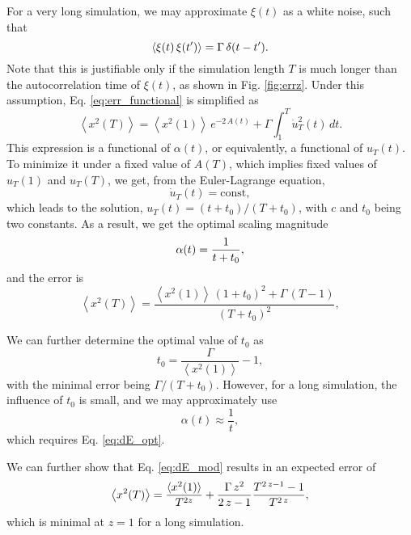 \documentclass[reprint]{revtex4-1}
\begin{document}
For a very long simulation,
we may approximate $\xi(t)$ as a white noise,
such that
\begin{equation}
  \left\langle \xi(t) \, \xi(t') \right\rangle
  = \Gamma \, \delta(t - t').
  \notag
\end{equation}
%
Note that this is justifiable only
if the simulation length $T$ is much longer than
the autocorrelation time of $\xi(t)$,
as shown in Fig. \ref{fig:errz}.
%
Under this assumption,
Eq. \eqref{eq:err_functional} is simplified as
%
\begin{equation}
  \left\langle
    x^2(T)
  \right\rangle
  =
  \left\langle
    x^2(1)
  \right\rangle
  \, e^{ -2 \, A(t) }
  +
  \Gamma
  \int_1^T
    \dot u_T^2(t) \, dt
  .
  \label{eq:err_functional_wn}
\end{equation}
%
This expression is a functional of $\alpha(t)$,
or equivalently, a functional of $u_T(t)$.
%
To minimize it under a fixed value of $A(T)$,
which implies fixed values of $u_T(1)$ and $u_T(T)$,
we get, from the Euler-Lagrange equation,
$$
\dot u_T(t) = \mathrm{const},
$$
which leads to the solution,
$u_T(t) = (t + t_0) / (T + t_0)$,
with $c$ and $t_0$ being two constants.
%
As a result, we get the optimal scaling magnitude
%
\begin{equation}
  \alpha(t) = \frac{ 1 } { t + t_0 }
  ,
  \notag
\end{equation}
%
and the error is
%
$$%
  \left\langle
    x^2(T)
  \right\rangle
  =
  \frac{
    \left\langle x^2(1) \right\rangle
    \, (1 + t_0)^2
    + \Gamma \, (T - 1)
  }
  {
    (T + t_0)^2
  }
  ,
$$%

We can further determine the optimal value of $t_0$ as
$$
t_0 = \frac{ \Gamma } { \left\langle x^2(1) \right\rangle } - 1,
$$
%
with the minimal error being $\Gamma / (T + t_0)$.
%
However, for a long simulation, the influence of $t_0$
is small, and we may approximately use
$$
\alpha(t) \approx \frac 1 t,
$$
which requires Eq. \eqref{eq:dE_opt}.

We can further show that Eq. \eqref{eq:dE_mod}
results in an expected error of
\begin{equation}
  \left\langle
  x^2(T)
  \right\rangle
  =
  \frac{ \langle x^2(1) \rangle } { T^{2z} }
  +
  \frac{ \Gamma \, z^2 } { 2 \, z - 1 }
  \frac{
    T^{2 \, z - 1} - 1
  }
  {
    T^{2 \, z}
  }
  ,
  \notag
\end{equation}
which is minimal at $z = 1$ for a long simulation.
\end{document}
